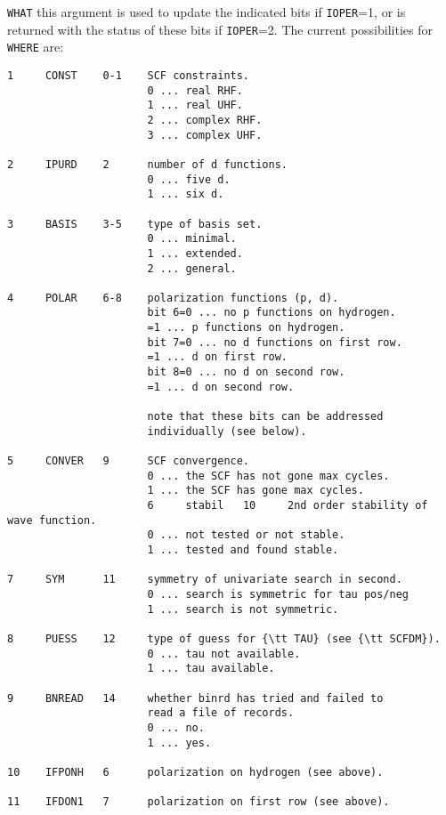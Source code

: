 {\tt WHAT}  this argument is used to update the indicated
bits if {\tt IOPER}=1, or is returned with the
status of these bits if {\tt IOPER}=2.
The current possibilities for {\tt WHERE} are:
{\small
\begin{verbatim}
1     CONST    0-1    SCF constraints.
                      0 ... real RHF.
                      1 ... real UHF.
                      2 ... complex RHF.
                      3 ... complex UHF.

2     IPURD    2      number of d functions.
                      0 ... five d.
                      1 ... six d.

3     BASIS    3-5    type of basis set.
                      0 ... minimal.
                      1 ... extended.
                      2 ... general.

4     POLAR    6-8    polarization functions (p, d).
                      bit 6=0 ... no p functions on hydrogen.
                      =1 ... p functions on hydrogen.
                      bit 7=0 ... no d functions on first row.
                      =1 ... d on first row.
                      bit 8=0 ... no d on second row.
                      =1 ... d on second row.

                      note that these bits can be addressed
                      individually (see below).

5     CONVER   9      SCF convergence.
                      0 ... the SCF has not gone max cycles.
                      1 ... the SCF has gone max cycles.
                      6     stabil   10     2nd order stability of wave function.
                      0 ... not tested or not stable.
                      1 ... tested and found stable.

7     SYM      11     symmetry of univariate search in second.
                      0 ... search is symmetric for tau pos/neg
                      1 ... search is not symmetric.

8     PUESS    12     type of guess for {\tt TAU} (see {\tt SCFDM}).
                      0 ... tau not available.
                      1 ... tau available.

9     BNREAD   14     whether binrd has tried and failed to
                      read a file of records.
                      0 ... no.
                      1 ... yes.

10    IFPONH   6      polarization on hydrogen (see above).

11    IFDON1   7      polarization on first row (see above).


\end{verbatim}}
